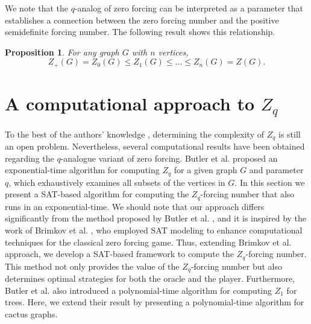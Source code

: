 \documentclass[11pt]{article}
\theoremstyle{plain}
\newtheorem{proposition}[theorem]{Proposition}
\theoremstyle{definition}
\theoremstyle{remark}
\begin{document}
We note that the $q$-analog of zero forcing can be interpreted as a parameter that establishes a connection between the zero forcing number and the positive semidefinite forcing number. The following result shows this relationship.

\begin{proposition} \label{proposition:z+zqz}
\cite[Proposition 3.2]{butler2015using} For any graph $G$ with $n$ vertices,
$$
Z_+(G) = Z_0(G) \leq Z_1(G) \leq \dots \leq Z_n(G) = Z(G).
$$
\end{proposition}




 
\section{A computational approach to \texorpdfstring{\(Z_q\)}{Zq}}\label{sec:computational}



To the best of the authors' knowledge \cite{private}, determining the complexity of $Z_q$ is still an open problem. Nevertheless, several computational results have been obtained regarding the $q$-analogue variant of zero forcing. Butler et al. \cite{butler2015using} proposed an exponential-time algorithm for computing $Z_q$ for a given graph $G$ and parameter $q$, which exhaustively examines all subsets of the vertices in $G$. In this section we present a SAT-based algorithm for computing the $Z_q$-forcing number that also runs in an exponential-time. We should note that our approach differs significantly from the method proposed by Butler et al. \cite{butler2015using}, and it is inspired by the work of Brimkov et al. \cite{bmh2021}, who employed SAT modeling to enhance computational techniques for the classical zero forcing game. Thus, extending Brimkov et al. approach, we develop a SAT-based framework to compute the $Z_q$-forcing number. This method not only provides the value of the $Z_q$-forcing number but also determines optimal strategies for both the oracle and the player. Furthermore, Butler et al. \cite{butler2020properties} also introduced a polynomial-time algorithm for computing $Z_1$ for trees. Here, we extend their result by presenting a polynomial-time algorithm for cactus graphs.


\end{document}
